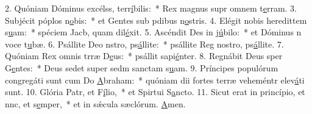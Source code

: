 2. Quóniam Dóminus excélss, terr\uline{í}bilis:~* Rex magnus supr omnem t\uline{e}rram.
3. Subjécit póplos n\uline{o}bis:~* et Gentes sub pdibus n\uline{o}stris.
4. Elégit nobis heredittem s\uline{u}am:~* spéciem Jacb, quam dil\uline{é}xit.
5. Ascéndit Des in j\uline{ú}bilo:~* et Dóminus n voce t\uline{u}bæ.
6. Psállite Deo nstro, ps\uline{á}llite:~* psállite Reg nostro, ps\uline{á}llite.
7. Quóniam Rex omnis trræ D\uline{e}us:~* psállit sapi\uline{é}nter.
8. Regnábit Deus sper G\uline{e}ntes:~* Deus sedet super sedm sanctam s\uline{u}am.
9. Príncipes populórum congregáti sunt cum Do \uline{A}braham:~* quóniam dii fortes terræ veheméntr elev\uline{á}ti sunt.
10. Glória Patr, et F\uline{í}lio,~* et Spirtui S\uline{a}ncto.
11. Sicut erat in princípio, et nnc, et s\uline{e}mper,~* et in sǽcula sæclórum. \uline{A}men.
